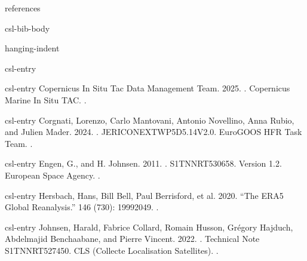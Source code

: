 \documentclass[a4paper,10pt,english]{sphinxmanual}
\begin{document}
\begin{sphinxuseclass}{references}
\begin{sphinxuseclass}{csl-bib-body}
\begin{sphinxuseclass}{hanging-indent}
\begin{sphinxuseclass}{csl-entry}
\end{sphinxuseclass}
\begin{sphinxuseclass}{csl-entry}
\sphinxAtStartPar
Copernicus In Situ Tac Data Management Team. 2025. . Copernicus Marine In Situ TAC. .

\end{sphinxuseclass}
\begin{sphinxuseclass}{csl-entry}
\sphinxAtStartPar
Corgnati, Lorenzo, Carlo Mantovani, Antonio Novellino, Anna Rubio, and Julien Mader. 2024. . JERICO\sphinxhyphen{}NEXT\sphinxhyphen{}WP5\sphinxhyphen{}D5.14\sphinxhyphen{}V2.0. EuroGOOS HFR Task Team. .

\end{sphinxuseclass}
\begin{sphinxuseclass}{csl-entry}
\sphinxAtStartPar
Engen, G., and H. Johnsen. 2011. . S1\sphinxhyphen{}TN\sphinxhyphen{}NRT\sphinxhyphen{}53\sphinxhyphen{}0658. Version 1.2. European Space Agency. .

\end{sphinxuseclass}
\begin{sphinxuseclass}{csl-entry}
\sphinxAtStartPar
Hersbach, Hans, Bill Bell, Paul Berrisford, et al. 2020. “The ERA5 Global Reanalysis.”  146 (730): 1999\textendash{}2049. .

\end{sphinxuseclass}
\begin{sphinxuseclass}{csl-entry}
\sphinxAtStartPar
Johnsen, Harald, Fabrice Collard, Romain Husson, Grégory Hajduch, Abdelmajid Benchaabane, and Pierre Vincent. 2022. . Technical Note S1\sphinxhyphen{}TN\sphinxhyphen{}NRT\sphinxhyphen{}52\sphinxhyphen{}7450. CLS (Collecte Localisation Satellites). .


\end{sphinxuseclass}
\end{sphinxuseclass}
\end{sphinxuseclass}
\end{sphinxuseclass}
\end{document}
